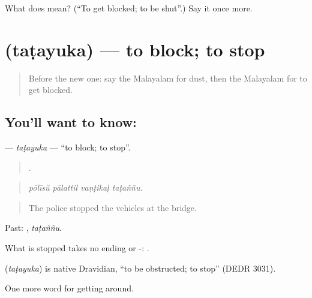 \begin{tcolorbox}[breakable,colback=teal!4,colframe=teal!35!black,title={Before you move on}]
What does  mean? (\textquotedblleft{}To get blocked; to be shut\textquotedblright{}.) Say it once more.
\end{tcolorbox}
\section[\texorpdfstring{\ml{തടയുക} (taṭayuka)}{തടയുക (taṭayuka)}]{ (taṭayuka) — to block; to stop}

\label{lesson:ML-C516-tatayuka}



\begin{quote}
Before the new one: say the Malayalam for dust, then the Malayalam for to get blocked.
\end{quote}

\subsection*{You'll want to know: }
\textbf{} — \emph{taṭayuka} — \textquotedblleft{}to block; to stop\textquotedblright{}.

\begin{quote}
   .
\end{quote}

\begin{quote}
\emph{pōlīsŭ pālattil vaṇṭikaḷ taṭaññu.}
\end{quote}

\begin{quote}
The police stopped the vehicles at the bridge.
\end{quote}

Past: , \emph{taṭaññu}.

What is stopped takes no ending or -:  .

\begin{cousinweb}
\textbf{} (\emph{taṭayuka}) is native Dravidian, \textquotedblleft{}to be obstructed; to stop\textquotedblright{} (DEDR 3031).
\end{cousinweb}

\begin{grammarlens}[title={What you've built}]
One more word for getting around.
\end{grammarlens}

